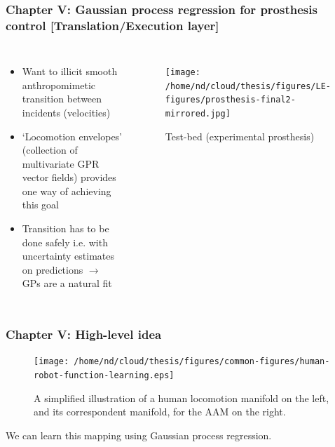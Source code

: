 \documentclass[aspectratio=169]{beamer}
\begin{document}
\begin{frame}[plain]
    \frametitle{Chapter V: Gaussian process regression for prosthesis control [Translation/Execution layer]} 
    \begin{columns}[t] 
        \begin{itemize}
            \item Want to illicit smooth anthropomimetic transition between incidents (velocities) 
            \item `Locomotion envelopes' (collection of multivariate GPR vector fields) provides one way of achieving
                this goal 
            \item Transition has to be done safely i.e. with uncertainty estimates on predictions $\rightarrow$ GPs are a
                natural fit
        \end{itemize}
        \vspace{-1cm}
        \begin{figure}
            \centering
            \texttt{[image: /home/nd/cloud/thesis/figures/LE-figures/prosthesis-final2-mirrored.jpg]}
            \caption{Test-bed (experimental prosthesis)}
        \end{figure}
    \end{columns}
\end{frame}

\begin{frame}[plain]
    \frametitle{Chapter V: High-level idea} 
    \begin{figure}
        \centering
        \texttt{[image: /home/nd/cloud/thesis/figures/common-figures/human-robot-function-learning.eps]}
        \caption{A simplified illustration of a human locomotion manifold on the left, and its
correspondent manifold, for the AAM on the right.}
    \end{figure}
    We can learn this mapping using Gaussian process regression.
\end{frame}
\end{document}
